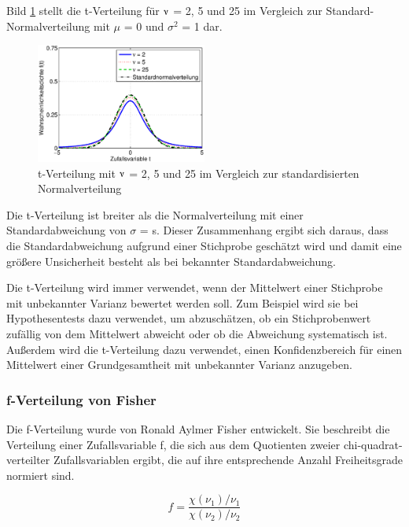 \noindent Bild \ref{fig:Testverteilungen_Student} stellt die t-Verteilung f\"{u}r $\nuup$ = 2, 5 und 25 im Vergleich zur Standard-Normalverteilung mit $\mu$ = 0 und $\sigma^{2}$ = 1 dar.

\begin{figure}[H]
  \centerline{\includegraphics[width=0.5\textwidth]{Kapitel4/Bilder/image45}}
  \caption{t-Verteilung mit $\nuup$ = 2, 5 und 25 im Vergleich zur standardisierten Normalverteilung}
  \label{fig:Testverteilungen_Student}
\end{figure}

\noindent Die t-Verteilung ist breiter als die Normalverteilung mit einer Standardabweichung von $\sigma$ = s. Dieser Zusammenhang ergibt sich daraus, dass die Standardabweichung aufgrund einer Stichprobe gesch\"{a}tzt wird und damit eine gr\"{o}{\ss}ere Unsicherheit besteht als bei bekannter Standardabweichung.\newline

\noindent Die t-Verteilung wird immer verwendet, wenn der Mittelwert einer Stichprobe mit unbekannter Varianz bewertet werden soll. Zum Beispiel wird sie bei Hypothesentests dazu verwendet, um abzusch\"{a}tzen, ob ein Stichprobenwert zuf\"{a}llig von dem Mittelwert abweicht oder ob die Abweichung systematisch ist. Au{\ss}erdem wird die t-Verteilung dazu verwendet, einen Konfidenzbereich f\"{u}r einen Mittelwert einer Grundgesamtheit mit unbekannter Varianz anzugeben.

\subsubsection{f-Verteilung von Fisher}

\noindent Die f-Verteilung wurde von Ronald Aylmer Fisher entwickelt. Sie beschreibt die Verteilung einer Zufallsvariable f, die sich aus dem Quotienten zweier chi-quadrat-verteilter Zufallsvariablen ergibt, die auf ihre entsprechende Anzahl Freiheitsgrade normiert sind.

\begin{equation}\label{eq:fourtwohundredfourtysix}
f=\dfrac{\chi \left(\nu _{1} \right)/\nu _{1} }{\chi \left(\nu _{2} \right)/\nu _{2}}
\end{equation}

